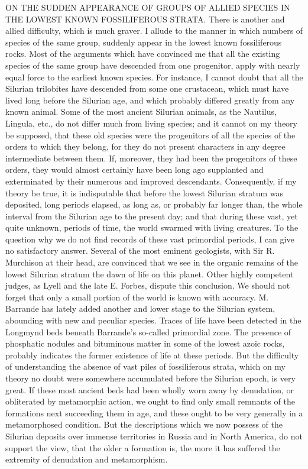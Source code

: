ON THE SUDDEN APPEARANCE OF GROUPS OF ALLIED SPECIES IN THE LOWEST KNOWN FOSSILIFEROUS STRATA.
There is another and allied difficulty, which is much graver. I allude to the manner in which numbers of species of the same group, suddenly appear in the lowest known fossiliferous rocks. Most of the arguments which have convinced me that all the existing species of the same group have descended from one progenitor, apply with nearly equal force to the earliest known species. For instance, I cannot doubt that all the Silurian trilobites have descended from some one crustacean, which must have lived long before the Silurian age, and which probably differed greatly from any known animal. Some of the most ancient Silurian animals, as the Nautilus, Lingula, etc., do not differ much from living species; and it cannot on my theory be supposed, that these old species were the progenitors of all the species of the orders to which they belong, for they do not present characters in any degree intermediate between them. If, moreover, they had been the progenitors of these orders, they would almost certainly have been long ago supplanted and exterminated by their numerous and improved descendants.
Consequently, if my theory be true, it is indisputable that before the lowest Silurian stratum was deposited, long periods elapsed, as long as, or probably far longer than, the whole interval from the Silurian age to the present day; and that during these vast, yet quite unknown, periods of time, the world swarmed with living creatures.
To the question why we do not find records of these vast primordial periods, I can give no satisfactory answer. Several of the most eminent geologists, with Sir R. Murchison at their head, are convinced that we see in the organic remains of the lowest Silurian stratum the dawn of life on this planet. Other highly competent judges, as Lyell and the late E. Forbes, dispute this conclusion. We should not forget that only a small portion of the world is known with accuracy. M. Barrande has lately added another and lower stage to the Silurian system, abounding with new and peculiar species. Traces of life have been detected in the Longmynd beds beneath Barrande's so-called primordial zone. The presence of phosphatic nodules and bituminous matter in some of the lowest azoic rocks, probably indicates the former existence of life at these periods. But the difficulty of understanding the absence of vast piles of fossiliferous strata, which on my theory no doubt were somewhere accumulated before the Silurian epoch, is very great. If these most ancient beds had been wholly worn away by denudation, or obliterated by metamorphic action, we ought to find only small remnants of the formations next succeeding them in age, and these ought to be very generally in a metamorphosed condition. But the descriptions which we now possess of the Silurian deposits over immense territories in Russia and in North America, do not support the view, that the older a formation is, the more it has suffered the extremity of denudation and metamorphism.
